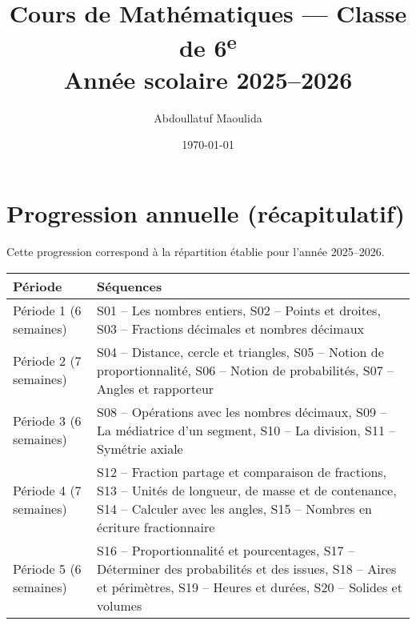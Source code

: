 \documentclass[12pt,a4paper]{book}
\title{Cours de Mathématiques — Classe de 6\textsuperscript{e}\\[0.4em]\large Année scolaire 2025–2026}
\author{Abdoullatuf Maoulida}
\date{\today}
\begin{document}
\maketitle
\tableofcontents
\cleardoublepage


\cleardoublepage
\appendix
\chapter{Progression annuelle (récapitulatif)}
Cette progression correspond à la répartition établie pour l'année 2025–2026.

\begin{center}
\begin{tabular}{|l|l|}
\hline
\textbf{Période} & \textbf{Séquences}\\ \hline
Période 1 (6 semaines) & S01 -- Les nombres entiers, S02 -- Points et droites, S03 -- Fractions décimales et nombres décimaux\\ \hline
Période 2 (7 semaines) & S04 -- Distance, cercle et triangles, S05 -- Notion de proportionnalité, S06 -- Notion de probabilités, S07 -- Angles et rapporteur\\ \hline
Période 3 (6 semaines) & S08 -- Opérations avec les nombres décimaux, S09 -- La médiatrice d'un segment, S10 -- La division, S11 -- Symétrie axiale\\ \hline
Période 4 (7 semaines) & S12 -- Fraction partage et comparaison de fractions, S13 -- Unités de longueur, de masse et de contenance, S14 -- Calculer avec les angles, S15 -- Nombres en écriture fractionnaire\\ \hline
Période 5 (6 semaines) & S16 -- Proportionnalité et pourcentages, S17 -- Déterminer des probabilités et des issues, S18 -- Aires et périmètres, S19 -- Heures et durées, S20 -- Solides et volumes\\ \hline
\end{tabular}
\end{center}
\end{document}
